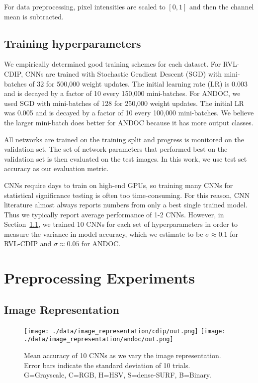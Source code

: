 \documentclass[10pt, conference, compsocconf]{IEEEtran}
\newcommand{\squeezeup}{\vspace{-2.5mm}}
\begin{document}
For data preprocessing, pixel intensities are scaled to $[0,1]$ and then the channel mean is subtracted.

\subsection{Training hyperparameters}

We empirically determined good training schemes for each dataset.
For RVL-CDIP, CNNs are trained with Stochastic Gradient Descent (SGD) with mini-batches of 32 for 500,000 weight updates.
The initial learning rate (LR) is 0.003 and is decayed by a factor of 10 every 150,000 mini-batches.
For ANDOC, we used SGD with mini-batches of 128 for 250,000 weight updates.
The initial LR was 0.005 and is decayed by a factor of 10 every 100,000 mini-batches.
We believe the larger mini-batch does better for ANDOC because it has more output classes.

All networks are trained on the training split and progress is monitored on the validation set.  
The set of network parameters that performed best on the validation set is then evaluated on the test images.
In this work, we use test set accuracy as our evaluation metric.

CNNs require days to train on high-end GPUs, so training many CNNs for statistical significance testing is often too time-consuming.
For this reason, CNN literature almost always reports numbers from only a best single trained model.
Thus we typically report average performance of 1-2 CNNs.
However, in Section~\ref{sec:image_rep}, we trained 10 CNNs for each set of hyperparameters in order to measure the variance in model accuracy, which we estimate to be $\sigma \approx 0.1$ for RVL-CDIP and $\sigma \approx 0.05$ for ANDOC. 


\section{Preprocessing Experiments}

\subsection{Image Representation}
\label{sec:image_rep}

\begin{figure}
\texttt{[image: ./data/image\_representation/cdip/out.png]}
\texttt{[image: ./data/image\_representation/andoc/out.png]}

\caption{Mean accuracy of 10 CNNs as we vary the image representation.  Error bars indicate the standard deviation of 10 trials. G=Grayscale, C=RGB, H=HSV, S=dense-SURF, B=Binary.}
\label{fig:image_rep}
\squeezeup
\end{figure}
	
\end{document}
